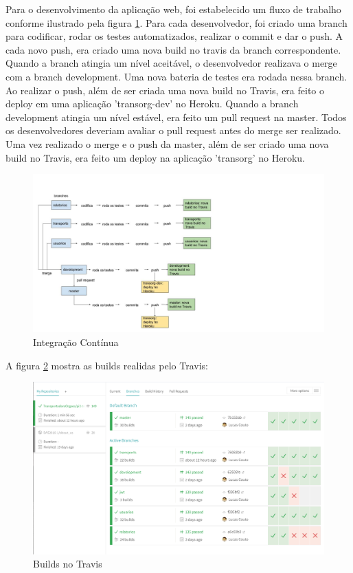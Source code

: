 Para o desenvolvimento da aplicação web, foi estabelecido um fluxo de trabalho conforme ilustrado pela figura \ref{integra_continua}. Para cada desenvolvedor, foi criado uma branch para codificar, rodar os testes automatizados, realizar o commit e dar o push. A cada novo push, era criado uma nova build no travis da branch correspondente. Quando a branch atingia um nível aceitável, o desenvolvedor realizava o merge com a branch development. Uma nova bateria de testes era rodada nessa branch. Ao realizar o push, além de ser criada uma nova build no Travis, era feito o deploy em uma aplicação 'transorg-dev' no Heroku. Quando a branch development atingia um nível estável, era feito um pull request na master. Todos os desenvolvedores deveriam avaliar o pull request antes do merge ser realizado. Uma vez realizado o merge e o push da master, além de ser criado uma nova build no Travis, era feito um deploy na aplicação 'transorg' no Heroku.

\begin{figure}[H]
	\centering
	\includegraphics[width=24cm]{figuras/integracao_continua.jpg}
	\caption{Integração Contínua} \label{integra_continua}
\end{figure}

A figura \ref{travis} mostra as builds realidas pelo Travis:

\begin{figure}[H]
	\centering
	\includegraphics[width=16cm]{figuras/travis.png}
	\caption{Builds no Travis} \label{travis}
\end{figure}

